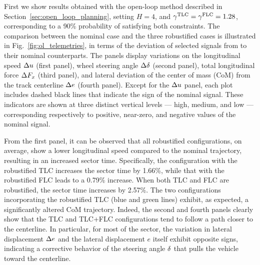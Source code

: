 First we show results obtained with the open-loop method described in Section~\ref{sec:open_loop_planning}, setting $H=4$, and $\gamma^\textrm{TLC}=\gamma^\textrm{FLC}=1.28$, corresponding to a 90\% probability of satisfying both constraints.
The comparison between the nominal case and the three robustified cases is illustrated in Fig.~\ref{fig:ol_telemetries}, in terms of the deviation of selected signals from to their nominal counterparts.
The panels display variations on the longitudinal speed $\Delta u$ (first panel), wheel steering angle $\Delta \delta$ (second panel), total longitudinal force $\Delta F_x$ (third panel), and lateral deviation of the center of mass (CoM) from the track centerline $\Delta e$ (fourth panel).
Except for the $\Delta u$ panel, each plot includes dashed black lines that indicate the sign of the nominal signal.
These indicators are shown at three distinct vertical levels --- high, medium, and low --- corresponding respectively to positive, near-zero, and negative values of the nominal signal.


From the first panel, it can be observed that all robustified configurations, on average, show a lower longitudinal speed compared to the nominal trajectory, resulting in an increased sector time. Specifically, the configuration with the robustified TLC increases the sector time by 1.66\%, while that with the robustified FLC leads to a 0.79\% increase. When both TLC and FLC are robustified, the sector time increases by 2.57\%.
The two configurations incorporating the robustified TLC (blue and green lines) exhibit, as expected, a significantly altered CoM trajectory.
Indeed, the second and fourth panels clearly show that the TLC and TLC+FLC configurations tend to follow a path closer to the centerline. In particular, for most of the sector, the variation in lateral displacement $\Delta e$ and the lateral displacement $e$ itself exhibit opposite signs, indicating a corrective behavior of the steering angle $\delta$ that pulls the vehicle toward the centerline.


